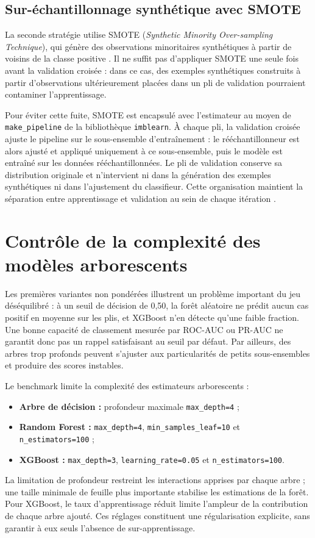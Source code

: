 \subsection{Sur-échantillonnage synthétique avec SMOTE}
La seconde stratégie utilise SMOTE (\textit{Synthetic Minority Over-sampling Technique}), qui génère des observations minoritaires synthétiques à partir de voisins de la classe positive \cite{chawla2002smote}. Il ne suffit pas d'appliquer SMOTE une seule fois avant la validation croisée : dans ce cas, des exemples synthétiques construits à partir d'observations ultérieurement placées dans un pli de validation pourraient contaminer l'apprentissage.

Pour éviter cette fuite, SMOTE est encapsulé avec l'estimateur au moyen de \texttt{make\allowbreak\_pipeline} de la bibliothèque \texttt{imblearn}. À chaque pli, la validation croisée ajuste le pipeline sur le sous-ensemble d'entraînement : le rééchantillonneur est alors ajusté et appliqué uniquement à ce sous-ensemble, puis le modèle est entraîné sur les données rééchantillonnées. Le pli de validation conserve sa distribution originale et n'intervient ni dans la génération des exemples synthétiques ni dans l'ajustement du classifieur. Cette organisation maintient la séparation entre apprentissage et validation au sein de chaque itération \cite{pedregosa2011scikit}.

\section{Contrôle de la complexité des modèles arborescents}
Les premières variantes non pondérées illustrent un problème important du jeu déséquilibré : à un seuil de décision de 0,50, la forêt aléatoire ne prédit aucun cas positif en moyenne sur les plis, et XGBoost n'en détecte qu'une faible fraction. Une bonne capacité de classement mesurée par ROC-AUC ou PR-AUC ne garantit donc pas un rappel satisfaisant au seuil par défaut. Par ailleurs, des arbres trop profonds peuvent s'ajuster aux particularités de petits sous-ensembles et produire des scores instables.

Le benchmark limite la complexité des estimateurs arborescents :
\begin{itemize}
    \item \textbf{Arbre de décision :} profondeur maximale \texttt{max\_depth=4} ;
    \item \textbf{Random Forest :} \texttt{max\_depth=4}, \texttt{min\_samples\_leaf=10} et \texttt{n\_estimators=100} ;
    \item \textbf{XGBoost :} \texttt{max\_depth=3}, \texttt{learning\_rate=0.05} et \texttt{n\_estimators=100}.
\end{itemize}
La limitation de profondeur restreint les interactions apprises par chaque arbre ; une taille minimale de feuille plus importante stabilise les estimations de la forêt. Pour XGBoost, le taux d'apprentissage réduit limite l'ampleur de la contribution de chaque arbre ajouté. Ces réglages constituent une régularisation explicite, sans garantir à eux seuls l'absence de sur-apprentissage.

